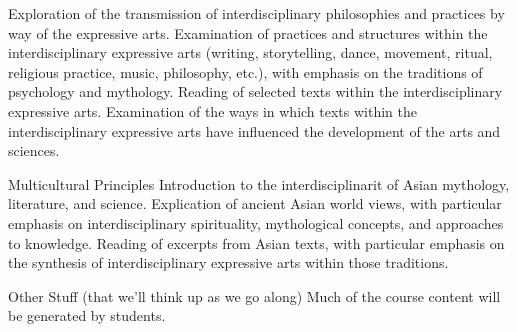 \documentclass[letterpaper,10pt,headsepline]{scrreprt}
\begin{document}
\begin{compactdesc}
Exploration of the transmission of interdisciplinary philosophies and practices by way of the expressive arts.
Examination of practices and structures within the interdisciplinary expressive arts (writing, storytelling, dance, movement, ritual, religious practice, music, philosophy, etc.), with emphasis on the traditions of psychology and mythology.
Reading of selected texts within the interdisciplinary expressive arts.
Examination of the ways in which texts within the interdisciplinary expressive arts have influenced the development of the arts and sciences.
\\
\item[Multicultural Principles]
Introduction to the interdisciplinarit of Asian mythology, literature, and science.
Explication of ancient Asian world views, with particular emphasis on interdisciplinary spirituality, mythological concepts, and approaches to knowledge.
Reading of excerpts from Asian texts, with particular emphasis on the synthesis of interdisciplinary expressive arts within those traditions.
\\
\item[Other Stuff (that we'll think up as we go along)]
Much of the course content will be generated by students.

\end{compactdesc}
\end{document}
